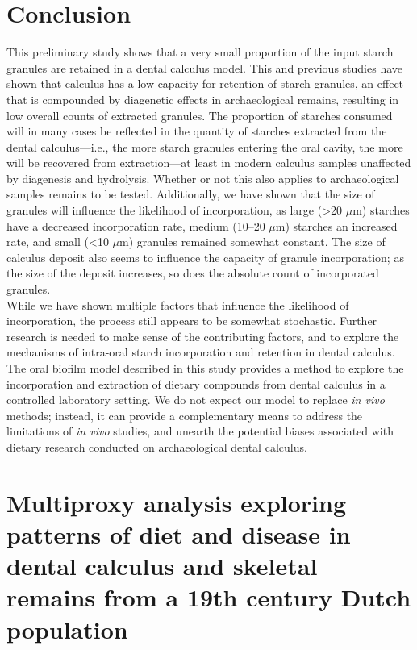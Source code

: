 \documentclass[
  letterpaper,
]{book}
\begin{document}

\hypertarget{conclusion}{%
\chapter{Conclusion}\label{conclusion}}

This preliminary study shows that a very small proportion of the input
starch granules are retained in a dental calculus model. This and
previous studies have shown that calculus has a low capacity for
retention of starch granules, an effect that is compounded by diagenetic
effects in archaeological remains, resulting in low overall counts of
extracted granules. The proportion of starches consumed will in many
cases be reflected in the quantity of starches extracted from the dental
calculus---i.e., the more starch granules entering the oral cavity, the
more will be recovered from extraction---at least in modern calculus
samples unaffected by diagenesis and hydrolysis. Whether or not this
also applies to archaeological samples remains to be tested.
Additionally, we have shown that the size of granules will influence the
likelihood of incorporation, as large (\textgreater20 \(\mu\)m) starches
have a decreased incorporation rate, medium (10--20 \(\mu\)m) starches
an increased rate, and small (\textless10 \(\mu\)m) granules remained
somewhat constant. The size of calculus deposit also seems to influence
the capacity of granule incorporation; as the size of the deposit
increases, so does the absolute count of incorporated granules.\\
While we have shown multiple factors that influence the likelihood of
incorporation, the process still appears to be somewhat stochastic.
Further research is needed to make sense of the contributing factors,
and to explore the mechanisms of intra-oral starch incorporation and
retention in dental calculus. The oral biofilm model described in this
study provides a method to explore the incorporation and extraction of
dietary compounds from dental calculus in a controlled laboratory
setting. We do not expect our model to replace \emph{in vivo} methods;
instead, it can provide a complementary means to address the limitations
of \emph{in vivo} studies, and unearth the potential biases associated
with dietary research conducted on archaeological dental calculus.


\hypertarget{multiproxy-analysis-exploring-patterns-of-diet-and-disease-in-dental-calculus-and-skeletal-remains-from-a-19th-century-dutch-population}{%
\chapter{Multiproxy analysis exploring patterns of diet and disease in
dental calculus and skeletal remains from a 19th century Dutch
population}\label{multiproxy-analysis-exploring-patterns-of-diet-and-disease-in-dental-calculus-and-skeletal-remains-from-a-19th-century-dutch-population}}
\end{document}
